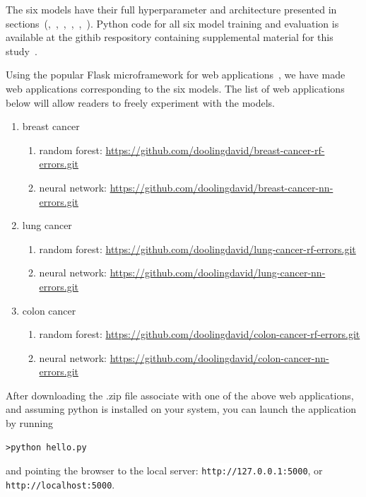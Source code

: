 \documentclass[10pt,letterpaper]{article}
\newcommand{\codewhite}[1]{\colorbox{white}{\texttt{#1}}}
\begin{document}
The six models have their full hyperparameter and architecture presented in sections~(,~,~,~,~,~). Python code for all six model training and evaluation is available at the githib respository containing supplemental material for this study~\cite{supp}.



Using the popular Flask microframework for web applications~\cite{flask}, we have made web applications corresponding to the six models. The list of web applications below will allow readers to freely experiment with the models.

\begin{enumerate}[noitemsep]
\item breast cancer 
    \begin{enumerate}[noitemsep]
    \item random forest: \url{https://github.com/doolingdavid/breast-cancer-rf-errors.git}
    \item neural network: \url{https://github.com/doolingdavid/breast-cancer-nn-errors.git}
    \end{enumerate}
\item lung cancer
   \begin{enumerate}[noitemsep]
   \item random forest: \url{https://github.com/doolingdavid/lung-cancer-rf-errors.git}
   \item neural network: \url{https://github.com/doolingdavid/lung-cancer-nn-errors.git}
    \end{enumerate}
\item colon cancer
  \begin{enumerate}[noitemsep]
   \item random forest: \url{https://github.com/doolingdavid/colon-cancer-rf-errors.git}
   \item neural network: \url{https://github.com/doolingdavid/colon-cancer-nn-errors.git}
   \end{enumerate}
\end{enumerate}

After downloading the .zip file associate with one of the above web applications, and assuming 
python is installed on your system, you can launch the application by running
\begin{verbatim}
>python hello.py
\end{verbatim}
and pointing the browser to the local server: \codewhite{http://127.0.0.1:5000}, or 
\codewhite{http://localhost:5000}.
\end{document}
